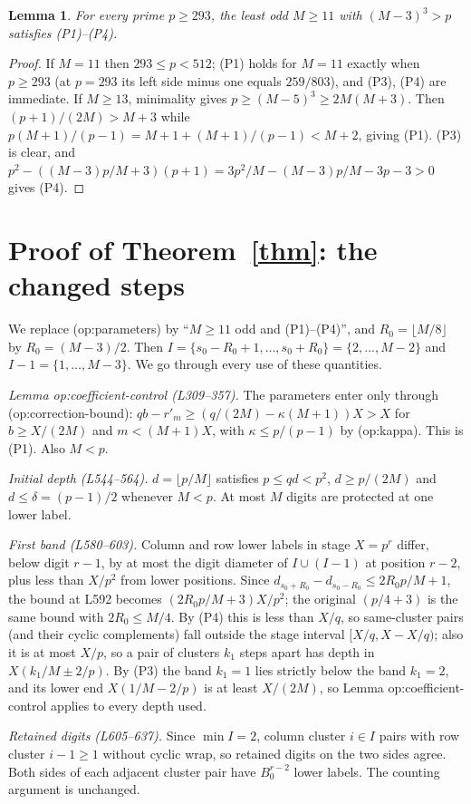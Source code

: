 \documentclass[11pt]{amsart}
\newtheorem{lemma}[theorem]{Lemma}
\theoremstyle{remark}
\begin{document}
\begin{lemma}\label{lem:cover}
For every prime $p\ge293$, the least odd $M\ge11$ with $(M-3)^3>p$ satisfies (P1)--(P4).
\end{lemma}
\begin{proof}
If $M=11$ then $293\le p<512$; (P1) holds for $M=11$ exactly when $p\ge293$ (at $p=293$ its
left side minus one equals $259/803$), and (P3), (P4) are immediate. If $M\ge13$, minimality gives $p\ge(M-5)^3\ge 2M(M+3)$.
Then $(p+1)/(2M)>M+3$ while $p(M+1)/(p-1)=M+1+(M+1)/(p-1)<M+2$, giving (P1).
(P3) is clear, and $p^2-((M-3)p/M+3)(p+1)=3p^2/M-(M-3)p/M-3p-3>0$ gives (P4).
\end{proof}

\section{Proof of Theorem~\ref{thm}: the changed steps}
We replace (op:parameters) by ``$M\ge11$ odd and (P1)--(P4)'', and $R_0=\lfloor M/8\rfloor$ by
$R_0=(M-3)/2$. Then $I=\{s_0-R_0+1,\dots,s_0+R_0\}=\{2,\dots,M-2\}$ and $I-1=\{1,\dots,M-3\}$.
We go through every use of these quantities.

\emph{Lemma op:coefficient-control (L309--357).} The parameters enter only through
(op:correction-bound): $qb-r'_m\ge (q/(2M)-\kappa(M+1))X>X$ for $b\ge X/(2M)$ and
$m<(M+1)X$, with $\kappa\le p/(p-1)$ by (op:kappa). This is (P1). Also $M<p$.

\emph{Initial depth (L544--564).} $d=\lfloor p/M\rfloor$ satisfies $p\le qd<p^2$, $d\ge p/(2M)$
and $d\le\delta=(p-1)/2$ whenever $M<p$. At most $M$ digits are protected at one lower label.

\emph{First band (L580--603).} Column and row lower labels in stage $X=p^r$ differ, below digit
$r-1$, by at most the digit diameter of $I\cup(I-1)$ at position $r-2$, plus less than
$X/p^2$ from lower positions. Since
$d_{s_0+R_0}-d_{s_0-R_0}\le 2R_0p/M+1$, the bound at L592 becomes
$(2R_0p/M+3)X/p^2$; the original $(p/4+3)$ is the same bound with $2R_0\le M/4$.
By (P4) this is less than $X/q$, so same-cluster pairs (and their cyclic complements)
fall outside the stage interval $[X/q,X-X/q)$; also it is at most $X/p$, so a pair of clusters
$k_1$ steps apart has depth in $X(k_1/M\pm2/p)$. By (P3) the band $k_1=1$ lies strictly
below the band $k_1=2$, and its lower end $X(1/M-2/p)$ is at least $X/(2M)$, so
Lemma op:coefficient-control applies to every depth used.

\emph{Retained digits (L605--637).} Since $\min I=2$, column cluster $i\in I$ pairs with row cluster
$i-1\ge1$ without cyclic wrap, so retained digits on the two sides agree. Both sides of each
adjacent cluster pair have $B_0^{r-2}$ lower labels. The counting argument is unchanged.
\end{document}

